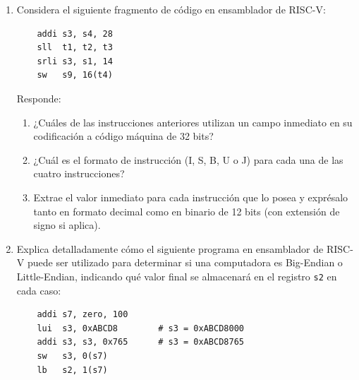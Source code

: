 \documentclass[letterpaper,12pt]{article}
\begin{document}
\begin{enumerate}
    \vspace{0.5cm}

    \item Considera el siguiente fragmento de código en ensamblador de RISC-V:
    \begin{verbatim}
    addi s3, s4, 28
    sll  t1, t2, t3
    srli s3, s1, 14
    sw   s9, 16(t4)
    \end{verbatim}
    
    Responde:
    \begin{enumerate}[label=\alph*)]
        \item ¿Cuáles de las instrucciones anteriores utilizan un campo inmediato en su codificación a código máquina de 32 bits?
        \item ¿Cuál es el formato de instrucción (I, S, B, U o J) para cada una de las cuatro instrucciones?
        \item Extrae el valor inmediato para cada instrucción que lo posea y exprésalo tanto en formato decimal como en binario de 12 bits (con extensión de signo si aplica).
    \end{enumerate}

    \vspace{0.5cm}

    \item Explica detalladamente cómo el siguiente programa en ensamblador de RISC-V puede ser utilizado para determinar si una computadora es Big-Endian o Little-Endian, indicando qué valor final se almacenará en el registro \texttt{s2} en cada caso:
    \begin{verbatim}
    addi s7, zero, 100
    lui  s3, 0xABCD8        # s3 = 0xABCD8000
    addi s3, s3, 0x765      # s3 = 0xABCD8765
    sw   s3, 0(s7)
    lb   s2, 1(s7)
    \end{verbatim}

\end{enumerate}
\end{document}
